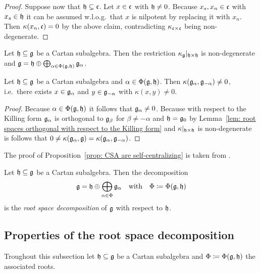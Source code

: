\begin{proof}
 Suppose now that $\mathfrak{h} \subsetneq \mathfrak{c}$. Let $x \in \mathfrak{c}$ with $\mathfrak{h} \neq 0$. Because $x_s, x_n \in \mathfrak{c}$ with $x_s \in \mathfrak{h}$ it can be assumed w.l.o.g.\ that $x$ is nilpotent by replacing it with $x_n$. Then $\kappa(x_n, \mathfrak{c}) = 0$ by the above claim, contradicting $\kappa_{\mathfrak{c} \times \mathfrak{c}}$ being non-degenerate.
\end{proof}


\begin{cor}
 Let $\mathfrak{h} \subseteq \mathfrak{g}$ be a Cartan subalgebra. Then the restriction $\kappa_{\mathfrak{g}}|_{\mathfrak{h} \times \mathfrak{h}}$ is non-degenerate and $\mathfrak{g} = \mathfrak{h} \oplus \bigoplus_{\alpha \in \Phi(\mathfrak{g},\mathfrak{h})} \mathfrak{g}_\alpha$.
\end{cor}


\begin{cor}\label{cor: g alpha and g -alpha pair non degenerate with the Killing form}
 Let $\mathfrak{h} \subseteq \mathfrak{g}$ be a Cartan subalgebra and $\alpha \in \Phi(\mathfrak{g},\mathfrak{h})$. Then $\kappa(\mathfrak{g}_\alpha, \mathfrak{g}_{-\alpha}) \neq 0$, i.e.\ there exists $x \in \mathfrak{g}_\alpha$ and $y \in \mathfrak{g}_{-\alpha}$ with $\kappa(x,y) \neq 0$.
\end{cor}
\begin{proof}
 Because $\alpha \in \Phi(\mathfrak{g},\mathfrak{h})$ it follows that $\mathfrak{g}_\alpha \neq 0$. Because with respect to the Killing form $\mathfrak{g}_\alpha$ is orthogonal to $\mathfrak{g}_\beta$ for $\beta \neq -\alpha$ and $\mathfrak{h} = \mathfrak{g}_0$ by Lemma~\ref{lem: root spaces orthogonal with respect to the Killing form} and $\kappa|_{\mathfrak{h} \times \mathfrak{h}}$ is non-degenerate is follows that $0 \neq \kappa(\mathfrak{g}_\alpha, \mathfrak{g}) = \kappa(\mathfrak{g}_\alpha, \mathfrak{g}_{-\alpha})$.
\end{proof}


\begin{rem}
 The proof of Proposition~\ref{prop: CSA are self-centralizing} is taken from \cite[\S 8.2]{Humphreys}.
\end{rem}


\begin{defi}
 Let $\mathfrak{h} \subseteq \mathfrak{g}$ be a Cartan subalgebra. Then the decomposition
 \[
  \mathfrak{g} = \mathfrak{h} \oplus \bigoplus_{\alpha \in \Phi} \mathfrak{g}_\alpha
  \quad\text{with}\quad
  \Phi \coloneqq \Phi(\mathfrak{g},\mathfrak{h})
 \]
 is the \emph{root space decomposition} of $\mathfrak{g}$ with respect to $\mathfrak{h}$.
\end{defi}


\subsection{Properties of the root space decomposition}
Troughout this subsection let $\mathfrak{h} \subseteq \mathfrak{g}$ be a Cartan subalgebra and $\Phi \coloneqq \Phi(\mathfrak{g},\mathfrak{h})$ the associated roots.


